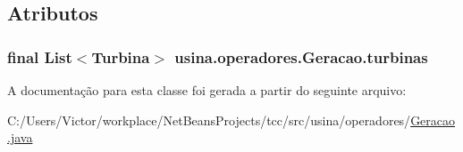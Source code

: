 \subsection{Atributos}
\hypertarget{classusina_1_1operadores_1_1_geracao_af3e8001df85b6894c6eeeec336851473}{
\subsubsection[{turbinas}]{\setlength{\rightskip}{0pt plus 5cm}final List$<${\bf Turbina}$>$ usina.\-operadores.\-Geracao.\-turbinas\hspace{0.3cm}{\ttfamily [private]}}}\label{classusina_1_1operadores_1_1_geracao_af3e8001df85b6894c6eeeec336851473}


A documentação para esta classe foi gerada a partir do seguinte arquivo\-:\begin{DoxyCompactItemize}
\item 
C\-:/\-Users/\-Victor/workplace/\-Net\-Beans\-Projects/tcc/src/usina/operadores/\hyperlink{_geracao_8java}{Geracao.\-java}\end{DoxyCompactItemize}
